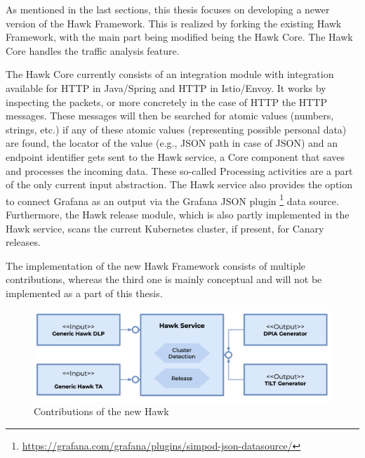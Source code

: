 

\graphicspath{{7/figures/}}

As mentioned in the last sections, this thesis focuses on developing a newer version of the Hawk Framework. This is realized by forking the existing Hawk Framework, with the main part being modified being the Hawk Core. The Hawk Core handles the traffic analysis feature.


The Hawk Core currently consists of an integration module with integration available for HTTP in Java/Spring and HTTP in Istio/Envoy. It works by inspecting the packets, or more concretely in the case of HTTP the HTTP messages. These messages will then be searched for atomic values (numbers, strings, etc.) if any of these atomic values (representing possible personal data) are found, the locator of the value (e.g., JSON path in case of JSON) and an endpoint identifier gets sent to the Hawk service, a Core component that saves and processes the incoming data. These so-called Processing activities are a part of the only current input abstraction. The Hawk service also provides the option to connect Grafana as an output via the Grafana JSON plugin \footnote{\url{https://grafana.com/grafana/plugins/simpod-json-datasource/}} data source. Furthermore, the Hawk release module, which is also partly implemented in the Hawk service, scans the current Kubernetes cluster, if present, for Canary releases.


The implementation of the new Hawk Framework consists of multiple contributions, whereas the third one is mainly conceptual and will not be implemented as a part of this thesis.

\begin{figure}[!h]
  \centering
  \includegraphics[width=0.95\columnwidth]{hawk-new.png}
  \caption[New Hawk Contributions]{Contributions of the new Hawk}
  \label{fig:hawk-new}
\end{figure}

